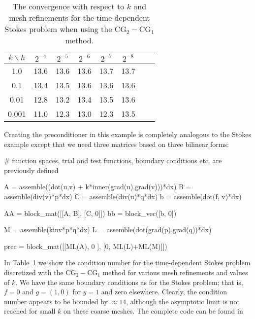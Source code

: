 \begin{table}
\begin{center}
\begin{tabular}{|c|c||c|c|c|c|c|c|}
\hline
$k\backslash h$ & $2^{-4}$ & $2^{-5}$ & $2^{-6}$ & $2^{-7}$ & $2^{-8}$ \\ \hline\hline
1.0 & 13.6 & 13.6 & 13.6 & 13.7 & 13.7 \\ \hline
0.1 & 13.4 & 13.5 & 13.6 & 13.6 & 13.6 \\ \hline
0.01 & 12.8 & 13.2 & 13.4 & 13.5 & 13.6 \\ \hline
0.001 & 11.0 & 12.3 & 13.0 & 12.3  & 13.5 \\ \hline
\end{tabular}
\caption{The convergence with respect to $k$ and mesh refinements for the time-dependent Stokes problem
when using the $\mathrm{CG}_2-\mathrm{CG}_1$ method.}\label{timestokes:ex}
\end{center}
\end{table}

Creating the preconditioner in this example is completely analogous to
the Stokes example except that we need three matrices based on three
bilinear forms:
\begin{python}

# function spaces, trial and test functions, boundary conditions etc. are previously defined

A = assemble((dot(u,v) + k*inner(grad(u),grad(v)))*dx)
B = assemble(div(v)*p*dx)
C = assemble(div(u)*q*dx)
b = assemble(dot(f, v)*dx)

AA = block_mat([[A, B],
                [C, 0]])
bb = block_vec([b, 0])

M = assemble(kinv*p*q*dx)
L = assemble(dot(grad(p),grad(q))*dx)

prec = block_mat([[ML(A),      0     ],
                  [0,     ML(L)+ML(M)]])
\end{python}
In Table~\ref{timestokes:ex} we show the condition number for the
time-dependent Stokes problem discretized with the
$\mathrm{CG}_2-\mathrm{CG}_1$ method for various mesh refinements and
values of $k$. We have the same boundary conditions as for the Stokes
problem; that is, $f=0$ and $g = (1,0)$ for $y=1$ and zero elsewhere.
Clearly, the condition number appears to be bounded by $\approx 14$,
although the asymptotic limit is not reached for small $k$ on these
coarse meshes.  The complete code can be found in 

